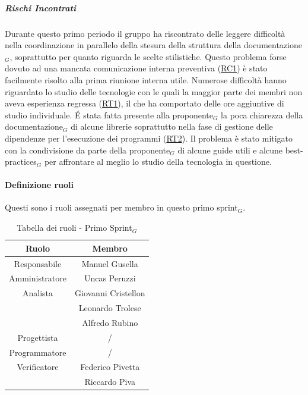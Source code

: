 \documentclass[10pt]{article}
\begin{document}
{{    \subparagraph*{Rischi Incontrati}\mbox{}

    Durante questo primo periodo il gruppo ha riscontrato delle leggere difficoltà nella coordinazione in parallelo della stesura della struttura della documentazione$_G$, soprattutto per quanto riguarda le scelte stilistiche. Questo problema forse dovuto ad una mancata comunicazione interna preventiva (\hyperref[RC1]{RC1}) è stato facilmente risolto alla prima riunione interna utile.\newline
    Numerose difficoltà hanno riguardato lo studio delle tecnologie con le quali la maggior parte dei membri non aveva esperienza regressa (\hyperref[RT1]{RT1}), il che ha comportato delle ore aggiuntive di studio individuale. \'E stata fatta presente alla proponente$_G$ la poca chiarezza della documentazione$_G$ di alcune librerie soprattutto nella fase di gestione delle dipendenze per l'esecuzione dei programmi (\hyperref[RT2]{RT2}). Il problema è stato mitigato con la condivisione da parte della proponente$_G$ di alcune guide utili e alcune best-practices$_G$ per affrontare al meglio lo studio della tecnologia in questione.

    
    \paragraph{Definizione ruoli}\mbox{}\vspace{0.4em}

    Questi sono i ruoli assegnati per membro in questo primo sprint$_G$.\\
    
    \begin{table}[H]
        \centering
        \begin{tabular}{|c|c|}
        \hline
        \rowcolor{gray!25}
        \textbf{Ruolo} & \textbf{Membro}\\
        \hline
        Responsabile & Manuel Gusella\\
        \hline
        Amministratore & Uncas Peruzzi\\ 
        \hline
        Analista & Giovanni Cristellon\\
        & Leonardo Trolese\\
        & Alfredo Rubino\\
        \hline
        Progettista & / \\
        \hline
        Programmatore & / \\
        \hline
        Verificatore & Federico Pivetta\\
        & Riccardo Piva\\
        \hline
        \end{tabular}
        \caption{Tabella dei ruoli - Primo Sprint$_G$}
    \end{table}

}}
\end{document}
